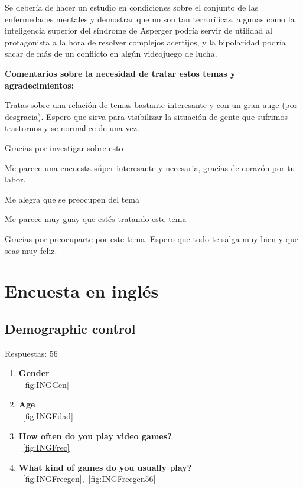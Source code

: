 \documentclass[12pt, a4paper,twoside,titlepage]{book}
\begin{document}
\begin{enumerate}[label=\textbf{\arabic*}.]
    Se debería de hacer un estudio en condiciones sobre el conjunto de las enfermedades mentales y demostrar que no son tan terroríficas, algunas como la inteligencia superior del síndrome de Asperger podría servir de utilidad al protagonista a la hora de resolver complejos acertijos, y la bipolaridad podría sacar de más de un conflicto en algún videojuego de lucha.

    \textbf{Comentarios sobre la necesidad de tratar estos temas y agradecimientos:}
    
    Tratas sobre una relación de temas bastante interesante y con un gran auge (por desgracia). Espero que sirva para visibilizar la situación de gente que sufrimos trastornos y se normalice de una vez.
    
    Gracias por investigar sobre esto 
    
    Me parece una encuesta súper interesante y necesaria, gracias de corazón por tu labor. 
    
    Me alegra que se preocupen del tema
    
    Me parece muy guay que estés tratando este tema
    
    Gracias por preocuparte por este tema. Espero que todo te salga muy bien y que seas muy feliz. 

    
\end{enumerate}




\newpage

\section{Encuesta en inglés}

\subsection{Demographic control}
Respuestas: 56
\begin{enumerate}[label=\textbf{\arabic*}.]
     \item \textbf{Gender}\\
    ~\ref{fig:INGGen}
     \item \textbf{Age}\\
    ~\ref{fig:INGEdad}
     \item \textbf{How often do you play video games?}\\
    ~\ref{fig:INGFrec}
     \item \textbf{What kind of games do you usually play?}\\
    ~\ref{fig:INGFrecgen},~\ref{fig:INGFrecgen56}
\end{enumerate}
\end{document}
